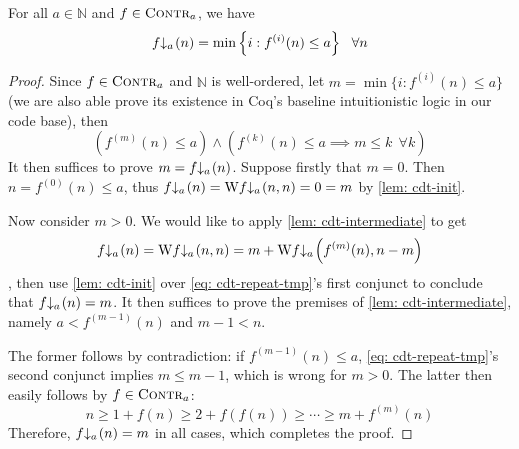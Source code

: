 \begin{thm} \label{thm: cdt-repeat}
	For all $a\in \mathbb{N}$ and $f\in \text{\scshape{Contr}}_{a}$, we have
	\begin{equation} \label{eq: cdt-minimum}
	\cdt{f}{a}(n) = \min\left\{ i : f^{(i)}(n) \le a \right\} \ \ \forall n
	\end{equation}
\end{thm}
\begin{proof}
Since $f\in \text{\scshape{Contr}}_{a}$ and $\mathbb{N}$ is well-ordered, let $m = \min\big\{i : f^{(i)}(n)\le a\big\}$ (we are also able prove its existence in Coq's baseline intuitionistic logic in our code base), then
	\begin{equation}
	\left(f^{(m)}(n) \le a\right) \label{eq: cdt-repeat-tmp} \wedge
	 \left(f^{(k)}(n)\le a \implies m \le k \ \ \forall k\right)
	\end{equation}
	It then suffices to prove $m = \cdt{f}{a}(n)$. Suppose firstly that $m = 0$. Then $n = f^{(0)}(n)\le a$, thus $\cdt{f}{a}(n) = \W\cdt{f}{a}(n, n) = 0 = m$ by \cref{lem: cdt-init}.
	
	Now consider $m > 0$. We would like to apply \cref{lem: cdt-intermediate} to get
	\begin{equation*}
	\cdt{f}{a}(n) = \W\cdt{f}{a}(n, n) = m + \W\cdt{f}{a}\left(f^{(m)}(n), n-m\right)
	\end{equation*}
	, then use \cref{lem: cdt-init} over \eqref{eq: cdt-repeat-tmp}'s first conjunct to conclude that $\cdt{f}{a}(n) = m$. It then suffices to prove the premises of \cref{lem: cdt-intermediate}, namely $a < f^{(m-1)}(n)$ and $m-1 < n$.
	
	The former follows by contradiction: if $f^{(m-1)}(n) \le a$, \eqref{eq: cdt-repeat-tmp}'s second conjunct implies $m\le m-1$, which is wrong for $m > 0$. The latter then easily follows by $f\in \text{\scshape{Contr}}_{a}$:
	\begin{equation*}
	n \ge 1 + f(n) \ge 2 + f(f(n)) \ge \cdots \ge m + f^{(m)}(n)
	\end{equation*}
	Therefore, $\cdt{f}{a}(n) = m$ in all cases, which completes the proof.
\end{proof}
